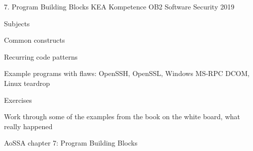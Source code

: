 \documentclass[Screen16to9,17pt]{foils}
\begin{document}
\mytitlepage
{7. Program Building Blocks}
{KEA Kompetence OB2 Software Security 2019}


\begin{list1}
\item Subjects
\begin{list2}
\item Common constructs
\item Recurring code patterns
\item Example programs with flaws: OpenSSH, OpenSSL, Windows MS-RPC DCOM, Linux teardrop
\end{list2}
\item Exercises
\begin{list2}
\item Work through some of the examples from the book on the white board, what really happened
\end{list2}
\end{list1}


\begin{list1}
\item AoSSA chapter 7: Program Building Blocks
\end{list1}



\begin{list1}
\item
\end{list1}


\end{document}
